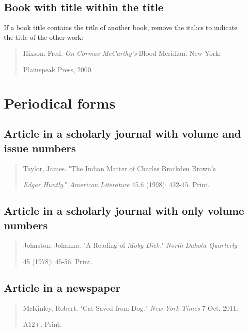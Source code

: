 \subsection{Book with title within the title}
If a book title contains the title of another book, remove the italics to indicate the title
of the other work:

\begin{quote}
Hixson, Fred. \emph{On Cormac McCarthy's }Blood Meridian. New York: 

\hspace{.4in}Plainspeak Press, 2000.
\end{quote}




\section{Periodical forms}

\subsection{Article in a scholarly journal with volume and issue numbers}
\begin{quote}
Taylor, James. "The Indian Matter of Charles Brockden Brown's

\hspace{.4in}\emph{Edgar Huntly}." \emph{American Literature} 45.6 (1998): 432-45. Print.
\end{quote}


\subsection{Article in a scholarly journal with only volume numbers}
\begin{quote}
Johnston, Johanna. "A Reading of \emph{Moby Dick}." \emph{North Dakota Quarterly}  

\hspace{.4in}45 (1978): 45-56. Print.
\end{quote}

\subsection{Article in a newspaper}
\begin{quote}
McKinley, Robert. "Cat Saved from Dog." \emph{New York Times} 7 Oct. 2011:

\hspace{.4in}A12+. Print.
\end{quote}


